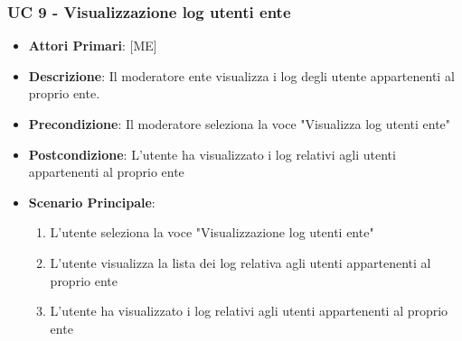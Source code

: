 		\subsubsection{UC 9 - Visualizzazione log utenti ente}
		\begin{itemize}
			\item \textbf{Attori Primari}: [ME]
			\item \textbf{Descrizione}: Il moderatore ente visualizza i log degli utente appartenenti al proprio ente.
			\item \textbf{Precondizione}: Il moderatore seleziona la voce "Visualizza log utenti ente"
			\item \textbf{Postcondizione}: L'utente ha visualizzato i log relativi agli utenti appartenenti al proprio ente
			\item \textbf{Scenario Principale}:
			\begin{enumerate}
				\item{L'utente seleziona la voce "Visualizzazione log utenti ente"}
				\item{L'utente visualizza la lista dei log relativa agli utenti appartenenti al proprio ente}
				\item{L'utente ha visualizzato i log relativi agli utenti appartenenti al proprio ente}
			\end{enumerate}	
		\end{itemize}


		



		



		


